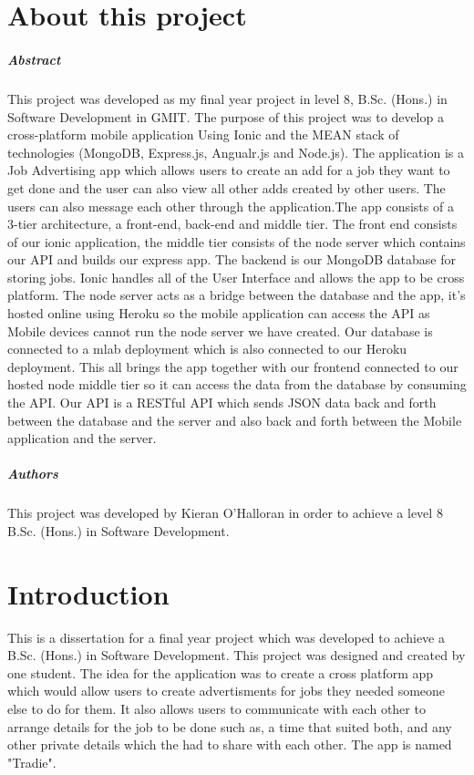 
\chapter*{About this project}
\paragraph{Abstract}
This project was developed as my final year project in level 8, B.Sc. (Hons.) in Software Development in GMIT. The purpose of this project was to develop a cross-platform mobile application Using Ionic and the MEAN stack of technologies (MongoDB, Express.js, Angualr.js and Node.js). The application is a Job Advertising app which allows users to create an add for a job they want to get done and the user can also view all other adds created by other users. The users can also message each other through the application.The app consists of a 3-tier architecture, a front-end, back-end and middle tier. The front end consists of our ionic application, the middle tier consists of the node server which contains our API and builds our express app. The backend is our MongoDB database for storing jobs. Ionic handles all of the User Interface and allows the app to be cross platform. The node server acts as a bridge between the database and the app, it’s hosted online using Heroku so the mobile application can access the API as Mobile devices cannot run the node server we have created. Our database is connected to a mlab deployment which is also connected to our Heroku deployment. This all brings the app together with our frontend connected to our hosted node middle tier so it can access the data from the database by consuming the API. Our API is a RESTful API which sends JSON data back and forth between the database and the server and also back and forth between the Mobile application and the server. 

\paragraph{Authors}
This project was developed by Kieran O'Halloran in order to achieve a level 8 B.Sc. (Hons.) in Software Development.

\chapter{Introduction}
This is a dissertation for a final year project which was developed to achieve a B.Sc. (Hons.) in Software Development. This project was designed and created by one student. The idea for the application was to create a cross platform app which would allow users to create advertisments for jobs they needed someone else to do for them. It also allows users to communicate with each other to arrange details for the job to be done such as, a time that suited both, and any other private details which the had to share with each other. The app is named "Tradie".
